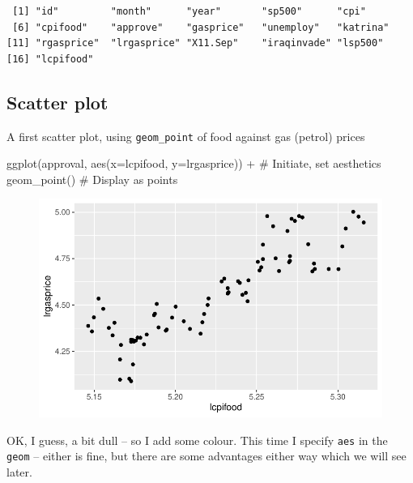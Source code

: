\documentclass[
  letterpaper,
]{book}
\newenvironment{Shaded}{\begin{snugshade}}{\end{snugshade}}
\newcommand{\AttributeTok}[1]{\textcolor[rgb]{0.40,0.45,0.13}{#1}}
\newcommand{\CommentTok}[1]{\textcolor[rgb]{0.37,0.37,0.37}{#1}}
\newcommand{\FunctionTok}[1]{\textcolor[rgb]{0.28,0.35,0.67}{#1}}
\newcommand{\NormalTok}[1]{\textcolor[rgb]{0.00,0.23,0.31}{#1}}
\newcommand{\SpecialCharTok}[1]{\textcolor[rgb]{0.37,0.37,0.37}{#1}}
\begin{document}
\begin{verbatim}
 [1] "id"         "month"      "year"       "sp500"      "cpi"       
 [6] "cpifood"    "approve"    "gasprice"   "unemploy"   "katrina"   
[11] "rgasprice"  "lrgasprice" "X11.Sep"    "iraqinvade" "lsp500"    
[16] "lcpifood"  
\end{verbatim}

\hypertarget{scatter-plot}{%
\subsection{Scatter plot}\label{scatter-plot}}

A first scatter plot, using \texttt{geom\_point} of food against gas
(petrol) prices

\begin{Shaded}
\begin{Highlighting}[]
\FunctionTok{ggplot}\NormalTok{(approval, }\FunctionTok{aes}\NormalTok{(}\AttributeTok{x=}\NormalTok{lcpifood, }\AttributeTok{y=}\NormalTok{lrgasprice)) }\SpecialCharTok{+}    \CommentTok{\# Initiate, set aesthetics}
  \FunctionTok{geom\_point}\NormalTok{()                                       }\CommentTok{\# Display as points}
\end{Highlighting}
\end{Shaded}

\begin{figure}[H]

{\centering \includegraphics{Appendix1_files/figure-pdf/p1-1.pdf}

}

\end{figure}

OK, I guess, a bit dull -- so I add some colour. This time I specify
\texttt{aes} in the \texttt{geom} -- either is fine, but there are some
advantages either way which we will see later.
\end{document}
